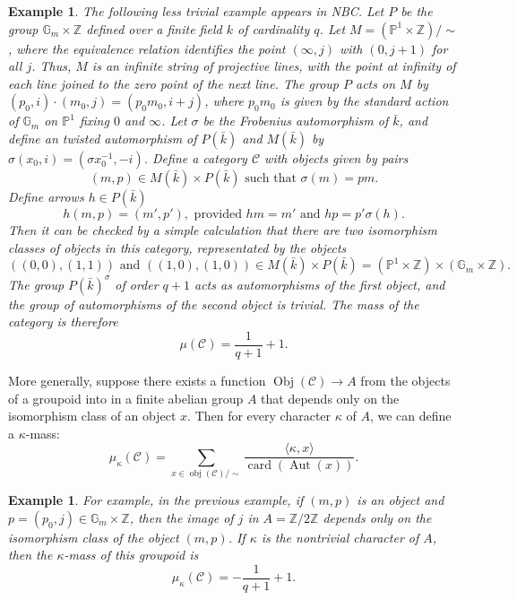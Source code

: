 \documentclass[brochure,english,12pt]{bourbaki}
\newtheorem{example}[equation]{Example}
\def\op#1{{\operatorname{#1}}}
\newcommand{\ring}[1]{\mathbb{#1}}
\def\C{{\mathcal C}}
\begin{document}
\begin{example}\label{ex:groupoid}
  The following less trivial example appears in NBC.  Let $P$ be the
  group $\ring{G}_m\times \ring{Z}$ defined over a finite field $k$ of
  cardinality $q$.  Let $M = (\ring{P}^1\times\ring{Z})/\sim$, where
  the equivalence relation identifies the point $(\infty,j)$ with
  $(0,j+1)$ for all $j$.  Thus, $M$ is an infinite string of
  projective lines, with the point at infinity of each line joined to
  the zero point of the next line.  The group $P$ acts on $M$ by
  $(p_0,i)\cdot (m_0,j) = (p_0 m_0,i+j)$, where $p_0m_0$ is given by
  the standard action of $\ring{G}_m$ on $\ring{P}^1$ fixing $0$ and
  $\infty$.  Let $\sigma$ be the Frobenius automorphism of $\bar k$,
  and define an twisted automorphism of $P(\bar k)$ and $M(\bar k)$ by
  $\sigma(x_0,i) = (\sigma x_0^{-1},-i)$.  Define a category $\mathcal
  C$ with objects given by pairs
\begin{equation}\label{eqn:objects}
(m,p)\in M(\bar k)\times P(\bar k) \text{ such that } \sigma(m) = p
m.
\end{equation}
Define  arrows $h\in P(\bar k)$ 
\begin{equation}\label{eqn:arrows}
h(m,p) = (m',p'),    \text{ provided } hm = m' \text{ and } h p = p'\sigma(h).
\end{equation}  
Then it can be checked by a simple
calculation that there are two isomorphism classes of objects in this
category, representated by the objects
\[
((0,0),(1,1))\text{ and }  ((1,0),(1,0))\in M(\bar k)\times P(\bar k) = 
(\ring{P}^1\times\ring{Z}) \times (\ring{G}_m\times\ring{Z}).
\]
The group $P(\bar k)^\sigma$ of order $q+1$ acts as automorphisms of the first object,
and the group of automorphisms of the second object is trivial.  The mass of the category
is therefore
\[
\mu(\C) = \frac{1}{q+1} + 1.
\]
\end{example}

More generally, suppose there exists a function $\op{Obj}(\C)\to  A$ from the objects
of a groupoid into in a finite abelian group $A$ that
depends only on the isomorphism class of an object $x$.  Then for every
character $\kappa$ of $A$, we can define a $\kappa$-mass:
\[
\mu_\kappa(\C)= \sum_{x\in \op{obj}(\C)/\sim} \frac{\langle\kappa,x\rangle}{\op{card}(\op{Aut}(x))}.
\]

\begin{example}
  For example, in the previous example, if $(m,p)$ is an object and
  $p=(p_0,j)\in \ring{G}_m\times\ring{Z}$, then the image of $j$ in
  $A=\ring{Z}/2\ring{Z}$ depends only on the isomorphism class of the
  object $(m,p)$.  If $\kappa$ is the nontrivial character of $A$,
  then the $\kappa$-mass of this groupoid is
\[
\mu_\kappa(\C) = -\frac{1}{q+1} + 1.
\]
\end{example}
\end{document}
